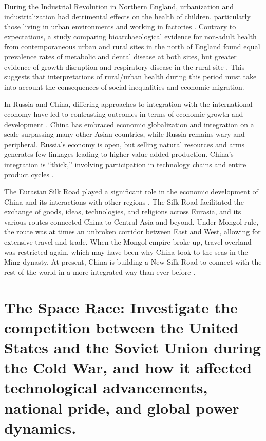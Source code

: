 \documentclass{article}
\begin{document}
During the Industrial Revolution in Northern England, urbanization and industrialization had detrimental effects on the health of children, particularly those living in urban environments and working in factories \cite{Gowland2018TitleBC}. Contrary to expectations, a study comparing bioarchaeological evidence for non-adult health from contemporaneous urban and rural sites in the north of England found equal prevalence rates of metabolic and dental disease at both sites, but greater evidence of growth disruption and respiratory disease in the rural site \cite{Gowland2018TitleBC}. This suggests that interpretations of rural/urban health during this period must take into account the consequences of social inequalities and economic migration.

In Russia and China, differing approaches to integration with the international economy have led to contrasting outcomes in terms of economic growth and development \cite{Balzer2008RussiaAC}. China has embraced economic globalization and integration on a scale surpassing many other Asian countries, while Russia remains wary and peripheral. Russia's economy is open, but selling natural resources and arms generates few linkages leading to higher value-added production. China's integration is ``thick,'' involving participation in technology chains and entire product cycles \cite{Balzer2008RussiaAC}.

The Eurasian Silk Road played a significant role in the economic development of China and its interactions with other regions \cite{Church2018TheES}. The Silk Road facilitated the exchange of goods, ideas, technologies, and religions across Eurasia, and its various routes connected China to Central Asia and beyond. Under Mongol rule, the route was at times an unbroken corridor between East and West, allowing for extensive travel and trade. When the Mongol empire broke up, travel overland was restricted again, which may have been why China took to the seas in the Ming dynasty. At present, China is building a New Silk Road to connect with the rest of the world in a more integrated way than ever before \cite{Church2018TheES}.


\section{The Space Race: Investigate the competition between the United States and the Soviet Union during the Cold War, and how it affected technological advancements, national pride, and global power dynamics.}
\end{document}

